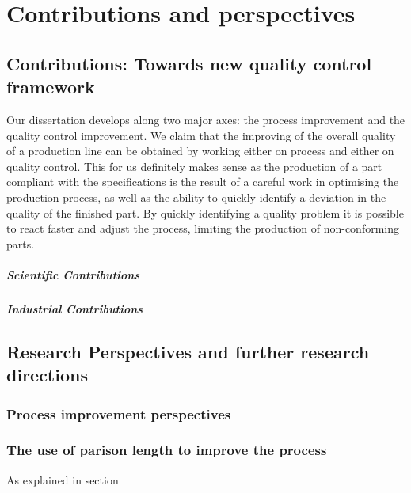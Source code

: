 \chapter{Contributions and perspectives} \label{Contributions and perspectives}
\minitoc


\section{Contributions: Towards new quality control framework}

Our dissertation develops along two major axes: the process improvement and the quality control improvement. We claim that the improving of the overall quality of a production line can be obtained by working either on process and either on quality control. This for us definitely makes sense as the production of a part compliant with the specifications is the result of a careful work in optimising the production process, as well as the ability to quickly identify a deviation in the quality of the finished part. By quickly identifying a quality problem it is possible to react faster and adjust the process, limiting the production of non-conforming parts.




\paragraph{Scientific Contributions}

\paragraph{Industrial Contributions}

\section{Research Perspectives and further research directions}

\subsection{Process improvement perspectives}

\subsection{The use of parison length to improve the process}

As explained in section 


